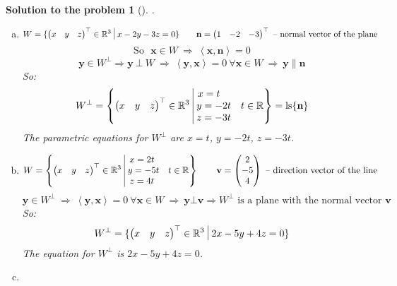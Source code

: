 \documentclass[12pt,a4]{article}
\newtheorem{solution}{Solution to the problem}
\newcommand\ls{\operatorname{ls}}
\newcommand{\bR}{{\mathbb R}}
\newcommand{\bn}{{\mathbf n}}
\newcommand{\bv}{{\mathbf v}}
\newcommand{\bx}{{\mathbf x}}
\newcommand{\by}{{\mathbf y}}
\newcommand{\sprod}[2]{\left \langle #1, #2 \right \rangle}
\begin{document}
\begin{solution}[]\rm .
\begin{enumerate}[(a)]
\item
\[
W = \{ \begin{pmatrix} x & y & z \end{pmatrix}^\top \in \mathbb{R}^3 ~\vline~ x-2y-3z=0 \}
\qquad
\bn = \begin{pmatrix} 1 & -2 & -3 \end{pmatrix}^\top \text{ -- normal vector of the plane}
\]
\[
\text{So ~} \bx \in W ~\Rightarrow~ \sprod{\bx}{\bn}=0
\]
\[
\by \in W^\perp \Rightarrow \by ~\bot ~W ~\Rightarrow~ \sprod{\by}{\bx}=0 ~\forall \bx \in W ~\Rightarrow~ \by \parallel \bn
\]
So:
\[
W^\perp = \left\{\begin{pmatrix} x & y & z \end{pmatrix}^\top \in \mathbb{R}^3
~\vline~
\begin{matrix}
x=t \quad\\
y=-2t \\
z=-3t \\
\end{matrix}
\quad t \in \mathbb{R}\right\} = \ls\{\bn\}
\]
The parametric equations for $W^\perp$ are $x=t$, $y=-2t$, $z=-3t$.
\item
\[
W = \left\{\begin{pmatrix} x & y & z \end{pmatrix}^\top \in \mathbb{R}^3
~\vline~
\begin{matrix}
x=2t ~\\
y=-5t \\
z=4t ~\\
\end{matrix}
\quad t \in \mathbb{R}\right\}
\qquad
\bv = \begin{pmatrix} 2 \\ -5 \\ 4 \end{pmatrix} \text{ -- direction vector of the line}
\]
\[
\by \in W^\perp ~\Rightarrow~ \sprod{\by}{\bx}=0 ~\forall \bx \in W ~\Rightarrow~ \by \bot \bv \Rightarrow W^\perp \text{ is a plane with the normal vector } \bv
\]
So:
\[
W^\perp = \{ \begin{pmatrix} x & y & z \end{pmatrix}^\top \in \mathbb{R}^3 ~\vline~ 2x-5y+4z=0 \}
\]
The equation for $W^\perp$ is $2x-5y+4z=0$.
\item

\end{enumerate}
\end{solution}
\end{document}

